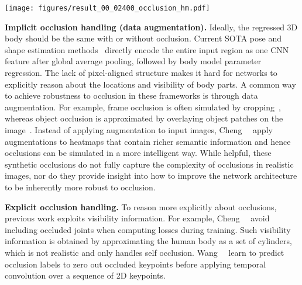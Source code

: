 \documentclass[10pt,twocolumn,letterpaper,usenames,dvipsnames]{article}
\begin{document}
\begin{figure*}[t]
	\centering
	\texttt{[image: figures/result\_00\_02400\_occlusion\_hm.pdf]}
	\vspace{-0.25in}
	\caption{{\bf Occlusion sensitivity analysis.} Heatmaps illustrate the error of SPIN \cite{SPIN:ICCV:2019} in individual joints caused by an occluder placed at each image location.
		Image size: $224\times224$; occluding patch: $40\times40$. The title of each heatmap names the joint and notes the range of the 3D error in mm visualized in the heatmap.
		See Section~\ref{sec:occlusion_analysis} for analysis.
	}
	\label{fig:occlusion_analysis}
\end{figure*}{}

{\bf Implicit occlusion handling (data augmentation).}
Ideally, the regressed 3D body should be the same with or without occlusion.
Current SOTA pose and shape estimation methods~\cite{kanazawa_hmr,kocabas2019vibe,SPIN:ICCV:2019} directly encode the entire input region as one CNN feature after global average pooling, followed by body model parameter regression. 
The lack of pixel-aligned structure makes it hard for networks to explicitly reason about the locations and  visibility of body parts. 
A common way to achieve robustness to occlusion in these frameworks is through data augmentation. 
For example, frame occlusion is often simulated by cropping~\cite{biggs2020multibodies,joo2020eft,Rockwell2020}, whereas object occlusion is approximated by overlaying object patches on the image~\cite{georgakis2020hierarchical,sarandi2018robust}. Instead of applying augmentation to input images, Cheng~\etal~\cite{cheng20203d} apply augmentations to heatmaps that contain richer semantic information and hence occlusions can be simulated in a more intelligent way.
While helpful, these synthetic occlusions do not fully capture the complexity of occlusions in realistic images, nor do they provide insight into how to improve the network architecture to be inherently more robust to occlusion.

{\bf Explicit occlusion handling.}
To reason more explicitly about occlusions, previous work exploits visibility information. 
For example, Cheng~\etal~\cite{cheng2019occlusion} avoid including occluded joints when computing losses during training. Such visibility information is obtained by approximating the human body as a set of cylinders, which is not realistic and only handles self occlusion. Wang~\etal~\cite{wang20203d} learn to predict occlusion labels to zero out occluded keypoints before applying temporal convolution over a sequence of 2D keypoints.
\end{document}
